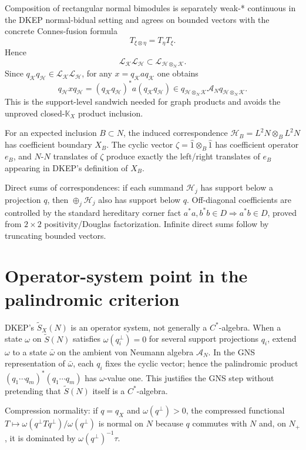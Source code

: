 \documentclass{article}
\begin{document}
Composition of rectangular normal bimodules is separately weak-* continuous in
the DKEP normal-bidual setting and agrees on bounded vectors with the concrete
Connes-fusion formula
\[
  T_{\xi\otimes\eta}=T_\eta T_\xi.
\]
Hence
\[
  \mathcal L_{\mathcal K}\mathcal L_{\mathcal H}
  \subset \mathcal L_{\mathcal H\otimes_N\mathcal K}.
\]
Since \(q_{\mathcal K}q_{\mathcal H}\in
\mathcal L_{\mathcal K}\mathcal L_{\mathcal H}\), for any
\(x=q_{\mathcal K}a q_{\mathcal K}\) one obtains
\[
 q_{\mathcal H}xq_{\mathcal H}
 =(q_{\mathcal K}q_{\mathcal H})^*a(q_{\mathcal K}q_{\mathcal H})
 \in q_{\mathcal H\otimes_N\mathcal K}\mathcal A_N
    q_{\mathcal H\otimes_N\mathcal K}.
\]
This is the support-level sandwich needed for graph products and avoids the
unproved closed-\(\mathbb K_X\) product inclusion.

For an expected inclusion \(B\subset N\), the induced correspondence
\(\mathcal H_B=L^2N\otimes_B L^2N\) has coefficient boundary \(X_B\).  The
cyclic vector \(\zeta=\hat1\otimes_B\hat1\) has coefficient operator \(e_B\),
and \(N\)-\(N\) translates of \(\zeta\) produce exactly the left/right
translates of \(e_B\) appearing in DKEP's definition of \(X_B\).

Direct sums of correspondences: if each summand \(\mathcal H_j\) has support
below a projection \(q\), then \(\oplus_j\mathcal H_j\) also has support below
\(q\).  Off-diagonal coefficients are controlled by the standard hereditary
corner fact \(a^*a,b^*b\in D\Rightarrow a^*b\in D\), proved from \(2\times2\)
positivity/Douglas factorization.  Infinite direct sums follow by truncating
bounded vectors.

\section*{Operator-system point in the palindromic criterion}

DKEP's \(\widetilde S_X(N)\) is an operator system, not generally a
\(C^*\)-algebra.  When a state \(\omega\) on \(\widetilde S(N)\) satisfies
\(\omega(q_i^\perp)=0\) for several support projections \(q_i\), extend
\(\omega\) to a state \(\bar\omega\) on the ambient von Neumann algebra
\(\mathcal A_N\).  In the GNS representation of \(\bar\omega\), each
\(q_i\) fixes the cyclic vector; hence the palindromic product
\((q_1\cdots q_m)^*(q_1\cdots q_m)\) has \(\omega\)-value one.  This justifies
the GNS step without pretending that \(\widetilde S(N)\) itself is a
\(C^*\)-algebra.

Compression normality: if \(q=q_X\) and \(\omega(q^\perp)>0\), the compressed
functional \(T\mapsto \omega(q^\perp Tq^\perp)/\omega(q^\perp)\) is normal on
\(N\) because \(q\) commutes with \(N\) and, on \(N_+\), it is dominated by
\(\omega(q^\perp)^{-1}\tau\).
\end{document}
